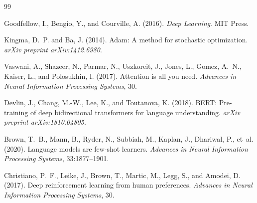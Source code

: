 \documentclass[12pt, a4paper]{article}
\theoremstyle{definition}
\theoremstyle{remark}
\begin{document}

\begin{thebibliography}{99}

Goodfellow, I., Bengio, Y., and Courville, A. (2016).
\newblock \textit{Deep Learning}.
\newblock MIT Press.

Kingma, D.~P. and Ba, J. (2014).
\newblock Adam: A method for stochastic optimization.
\newblock \textit{arXiv preprint arXiv:1412.6980}.

Vaswani, A., Shazeer, N., Parmar, N., Uszkoreit, J., Jones, L., Gomez, A.~N.,
  Kaiser, L., and Polosukhin, I. (2017).
\newblock Attention is all you need.
\newblock \textit{Advances in Neural Information Processing Systems}, 30.

Devlin, J., Chang, M.-W., Lee, K., and Toutanova, K. (2018).
\newblock BERT: Pre-training of deep bidirectional transformers for language
  understanding.
\newblock \textit{arXiv preprint arXiv:1810.04805}.

Brown, T.~B., Mann, B., Ryder, N., Subbiah, M., Kaplan, J., Dhariwal, P., et~al. (2020).
\newblock Language models are few-shot learners.
\newblock \textit{Advances in Neural Information Processing Systems}, 33:1877--1901.

Christiano, P.~F., Leike, J., Brown, T., Martic, M., Legg, S., and Amodei, D.
  (2017).
\newblock Deep reinforcement learning from human preferences.
\newblock \textit{Advances in Neural Information Processing Systems}, 30.

\end{thebibliography}
\end{document}
